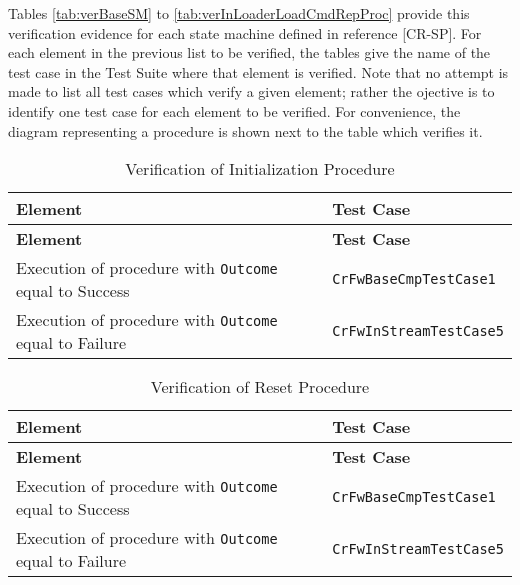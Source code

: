 \documentclass{pnp_article}
\begin{document}
Tables \ref{tab:verBaseSM} to \ref{tab:verInLoaderLoadCmdRepProc} provide this verification evidence for each state machine defined in reference [CR-SP]. For each element in the previous list to be verified, the tables give the name of the test case in the Test Suite where that element is verified. Note that no attempt is made to list all test cases which verify a given element; rather the ojective is to identify one test case for each element to be verified. For convenience, the diagram representing a procedure is shown next to the table which verifies it.

\begin{longtable}{|>{\raggedright}p{9.0cm}|P{4.0cm}|}
\caption{Verification of Initialization Procedure}
\label{tab:verInitProc}\\
\hline
{}
\textbf{Element} & \textbf{Test Case} \\
\hline
\endfirsthead
{}
\textbf{Element} & \textbf{Test Case} \\
\hline
\endhead
Execution of procedure with \texttt{Outcome} equal to Success & \texttt{CrFwBaseCmpTestCase1}\\
\hline
Execution of procedure with \texttt{Outcome} equal to Failure & \texttt{CrFwInStreamTestCase5}\\
\hline
\end{longtable}

\begin{longtable}{|>{\raggedright}p{8.0cm}|P{5.0cm}|}
\caption{Verification of Reset Procedure}
\label{tab:verResetProc}\\
\hline
{}
\textbf{Element} & \textbf{Test Case} \\
\hline
\endfirsthead
{}
\textbf{Element} & \textbf{Test Case} \\
\hline
\endhead
Execution of procedure with \texttt{Outcome} equal to Success & \texttt{CrFwBaseCmpTestCase1}\\
\hline
Execution of procedure with \texttt{Outcome} equal to Failure & \texttt{CrFwInStreamTestCase5}\\
\hline
\end{longtable}
\end{document}
